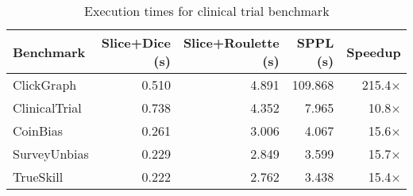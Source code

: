 \begin{table}[!t]
\centering
\begin{tabular}{lrrrr}
\toprule
Benchmark & Slice+Dice (s) & Slice+Roulette (s) & SPPL (s) & Speedup \\
\midrule
ClickGraph & 0.510 & 4.891 & 109.868 & 215.4× \\
ClinicalTrial & 0.738 & 4.352 & 7.965 & 10.8× \\
CoinBias & 0.261 & 3.006 & 4.067 & 15.6× \\
SurveyUnbias & 0.229 & 2.849 & 3.599 & 15.7× \\
TrueSkill & 0.222 & 2.762 & 3.438 & 15.4× \\
\bottomrule
\end{tabular}
\caption{Execution times for clinical trial benchmark}
\end{table}